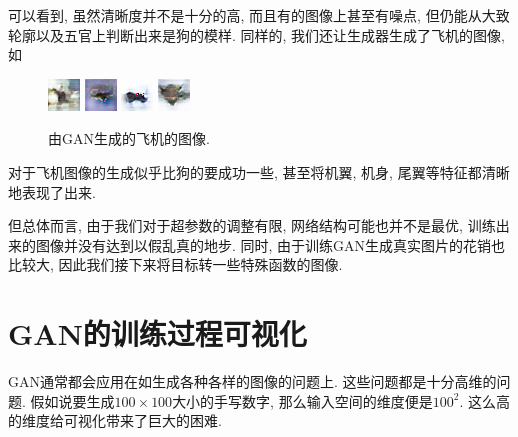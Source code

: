 \documentclass[lang=cn,11pt]{elegantpaper}
\begin{document}
\noindent 可以看到, 虽然清晰度并不是十分的高, 而且有的图像上甚至有噪点, 但仍能从大致轮廓以及五官上判断出来是狗的模样. 同样的, 我们还让生成器生成了飞机的图像, 如 
\begin{figure}[htbp]
  \centering
  \includegraphics[width=.2\textwidth]{air1}
  \includegraphics[width=.2\textwidth]{air2}
  \includegraphics[width=.2\textwidth]{air3}
  \includegraphics[width=.2\textwidth]{air4}
  \caption{由GAN生成的飞机的图像. \label{fig:air}}
\end{figure}

\noindent 对于飞机图像的生成似乎比狗的要成功一些, 甚至将机翼, 机身, 尾翼等特征都清晰地表现了出来. 

但总体而言, 由于我们对于超参数的调整有限, 网络结构可能也并不是最优, 训练出来的图像并没有达到以假乱真的地步. 同时, 由于训练GAN生成真实图片的花销也比较大, 因此我们接下来将目标转一些特殊函数的图像. 
\section{GAN的训练过程可视化}

GAN通常都会应用在如生成各种各样的图像的问题上. 这些问题都是十分高维的问题. 假如说要生成$100\times 100$大小的手写数字, 那么输入空间的维度便是$100^2$. 这么高的维度给可视化带来了巨大的困难. 
\end{document}
